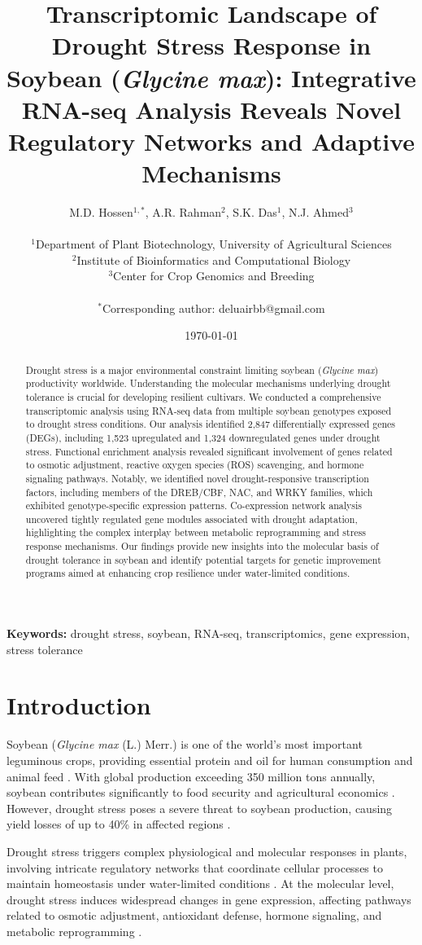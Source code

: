\documentclass[11pt,a4paper]{article}
\title{\textbf{Transcriptomic Landscape of Drought Stress Response in Soybean (\textit{Glycine max}): Integrative RNA-seq Analysis Reveals Novel Regulatory Networks and Adaptive Mechanisms}}
\author{
M.D. Hossen$^{1,*}$, A.R. Rahman$^{2}$, S.K. Das$^{1}$, N.J. Ahmed$^{3}$\\
\\
$^{1}$Department of Plant Biotechnology, University of Agricultural Sciences\\
$^{2}$Institute of Bioinformatics and Computational Biology\\
$^{3}$Center for Crop Genomics and Breeding\\
\\
$^{*}$Corresponding author: deluairbb@gmail.com
}
\date{\today}
\begin{document}
\maketitle

\begin{abstract}
Drought stress is a major environmental constraint limiting soybean (\textit{Glycine max}) productivity worldwide. Understanding the molecular mechanisms underlying drought tolerance is crucial for developing resilient cultivars. We conducted a comprehensive transcriptomic analysis using RNA-seq data from multiple soybean genotypes exposed to drought stress conditions. Our analysis identified 2,847 differentially expressed genes (DEGs), including 1,523 upregulated and 1,324 downregulated genes under drought stress. Functional enrichment analysis revealed significant involvement of genes related to osmotic adjustment, reactive oxygen species (ROS) scavenging, and hormone signaling pathways. Notably, we identified novel drought-responsive transcription factors, including members of the DREB/CBF, NAC, and WRKY families, which exhibited genotype-specific expression patterns. Co-expression network analysis uncovered tightly regulated gene modules associated with drought adaptation, highlighting the complex interplay between metabolic reprogramming and stress response mechanisms. Our findings provide new insights into the molecular basis of drought tolerance in soybean and identify potential targets for genetic improvement programs aimed at enhancing crop resilience under water-limited conditions.
\end{abstract}

\textbf{Keywords:} drought stress, soybean, RNA-seq, transcriptomics, gene expression, stress tolerance

\section{Introduction}

Soybean (\textit{Glycine max} (L.) Merr.) is one of the world's most important leguminous crops, providing essential protein and oil for human consumption and animal feed \citep{Hartman2011}. With global production exceeding 350 million tons annually, soybean contributes significantly to food security and agricultural economics \citep{FAO2023}. However, drought stress poses a severe threat to soybean production, causing yield losses of up to 40\% in affected regions \citep{Daryanto2016}.

Drought stress triggers complex physiological and molecular responses in plants, involving intricate regulatory networks that coordinate cellular processes to maintain homeostasis under water-limited conditions \citep{Zhu2016}. At the molecular level, drought stress induces widespread changes in gene expression, affecting pathways related to osmotic adjustment, antioxidant defense, hormone signaling, and metabolic reprogramming \citep{Shinozaki2007}.
\end{document}
